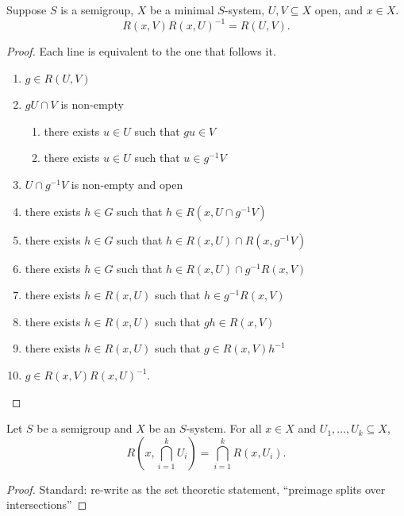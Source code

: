 \begin{lemma}
\label{lemma_return_time_algebra_three}
\leanok{}
    Suppose $S$ is a semigroup, $X$ be a minimal $S$-system, $U, V \subseteq X$ open, and $x \in X$.
    \[R(x,V)R(x,U)^{-1} = R(U,V).\]
\end{lemma}

\begin{proof}
\leanok{}
    Each line is equivalent to the one that follows it.
    \begin{enumerate}
        \item $g \in R(U,V)$
        \item $gU \cap V$ is non-empty
        \begin{enumerate}
            \item there exists $u \in U$ such that $gu \in V$
            \item there exists $u \in U$ such that $u \in g^{-1} V$
        \end{enumerate}
        \item $U \cap g^{-1} V$ is non-empty and open
        \item there exists $h \in G$ such that $h \in R(x, U \cap g^{-1}V)$
        \item there exists $h \in G$ such that $h \in R(x,U) \cap R(x,g^{-1}V)$
        \item there exists $h \in G$ such that $h \in R(x,U) \cap g^{-1} R(x,V)$
        \item there exists $h \in R(x,U)$ such that $h \in g^{-1} R(x,V)$
        \item there exists $h \in R(x,U)$ such that $gh \in R(x,V)$
        \item there exists $h \in R(x,U)$ such that $g \in R(x,V) h^{-1}$
        \item $g \in R(x,V) R(x,U)^{-1}$.
    \end{enumerate}
\end{proof}

\begin{lemma}
    \label{lemma_return_to_intersection}
    \leanok{}
    Let $S$ be a semigroup and $X$ be an $S$-system.  For all $x \in X$ and $U_1, \ldots, U_k \subseteq X$,
    \[R\left(x, \bigcap_{i=1}^k U_i \right) = \bigcap_{i=1}^k R(x,U_i).\]
\end{lemma}

\begin{proof}
\leanok{}
    Standard: re-write as the set theoretic statement, ``preimage splits over intersections''
\end{proof}

